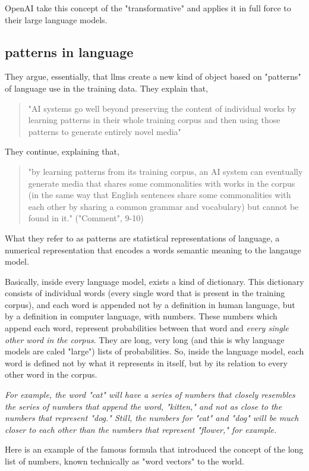 \documentclass[11pt]{article}
\begin{document}
OpenAI take this concept of the "transformative" and applies it in
full force to their large language models.

\subsection{patterns in language}
\label{sec:org1480914}
They argue, essentially, that llms create a new kind of object based
on "patterns" of language use in the training data. They explain that,
\begin{quote}
"AI systems go well beyond preserving the content of individual works
by learning patterns in their whole training corpus and then using
those patterns to generate entirely novel media"
\end{quote}
They continue, explaining that,
\begin{quote}
"by learning patterns from its training corpus, an AI system can
eventually generate media that shares some commonalities with works in
the corpus (in the same way that English sentences share some
commonalities with each other by sharing a common grammar and
vocabulary) but cannot be found in it." ("Comment", 9-10)
\end{quote}
What they refer to as patterns are statistical representations of
language, a numerical representation that encodes a words semantic
meaning to the langauge model.

Basically, inside every language model, exists a kind of dictionary.
This dictionary consists of individual words (every single word that
is present in the training corpus), and each word is appended not by a
definition in human language, but by a definition in computer
language, with numbers. These numbers which append each word,
represent probabilities between that word and \emph{every single other word
in the corpus}. They are long, very long (and this is why language
models are caled "large") lists of probabilities. So, inside the
language model, each word is defined not by what it represents in
itself, but by its relation to every other word in the corpus.

\emph{For example, the word "cat" will have a series of numbers that
closely resembles the series of numbers that append the word,
"kitten," and not as close to the numbers that represent "dog." Still,
the numbers for "cat" and "dog" will be much closer to each other than
the numbers that represent "flower," for example.}

Here is an example of the famous formula that introduced the concept
of the long list of numbers, known technically as "word vectors" to
the world.
\end{document}
